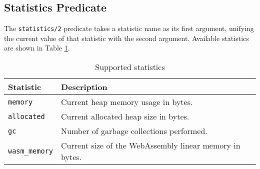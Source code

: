 \begin{appendices}
\section{Statistics Predicate}

The \texttt{statistics/2} predicate takes a statistic name as its first argument, unifying the current value of that statistic with the second argument. Available statistics are shown in Table \ref{table:statistics}.

\begin{table}
\centering
\begin{tabular}{ll}
\hline
\textbf{Statistic} & \textbf{Description} \\
\hline
\texttt{memory} & Current heap memory usage in bytes. \\
\texttt{allocated} & Current allocated heap size in bytes. \\
\texttt{gc} & Number of garbage collections performed. \\
\texttt{wasm\_memory} & Current size of the WebAssembly linear memory in bytes. \\
\hline
\end{tabular}
\caption{Supported statistics}
\label{table:statistics}
\end{table}

\end{appendices}